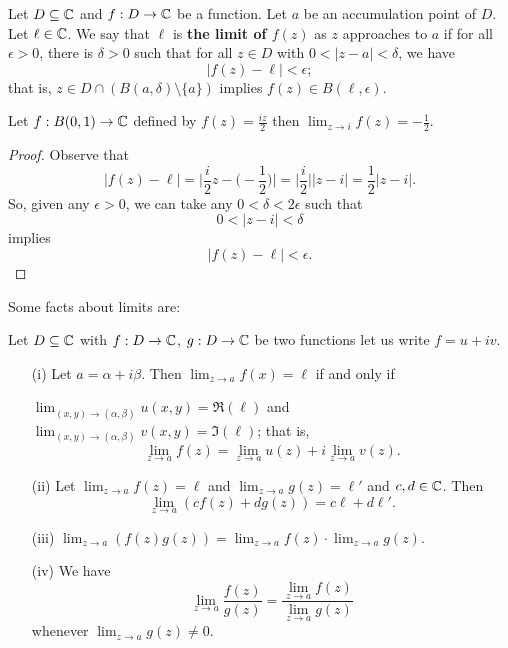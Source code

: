 \documentclass[a4paper]{report}
\begin{document}
\begin{definition}
    Let \( D \subseteq \mathbb{C}   \) and \( f: D \to \mathbb{C}  \) be a function. Let \( a \) be an accumulation point of \( D  \). Let \( \ell \in \mathbb{C}  \). We say that \( \ell  \) is \textbf{the limit of \( f(z) \)} as \( z  \) approaches to \( a  \) if for all \( \epsilon > 0 \), there is \( \delta> 0  \) such that for all \( z \in D  \) with \( 0 < |  z - a  |  < \delta \), we have
    \[  | f(z) - \ell | < \epsilon; \]
    that is, \( z \in D \cap (B(a,\delta) \setminus  \{ a \} ) \) implies \( f(z) \in B(\ell, \epsilon) \).
\end{definition}

\begin{eg}
    Let \( f: B(0,1) \to \mathbb{C}  \) defined by \( f(z) = \frac{ iz }{ 2  }  \) then \( \lim_{ z \to i }  f(z) = - \frac{ 1 }{ 2 }  \).
\end{eg}
\begin{proof}
Observe that 
\[  | f(z) - \ell | = \Big| \frac{ i }{ 2 } z - \Big(  - \frac{ 1 }{ 2 }  \Big) \Big| = \Big| \frac{ i }{ 2 }  \Big|  | z - i  |  = \frac{ 1 }{ 2 }  | z - i  |.  \]
So, given any \( \epsilon > 0  \), we can take any \( 0 < \delta< 2 \epsilon  \) such that 
\[  0 < | z - i  | < \delta  \] implies 
\[  | f(z) - \ell | < \epsilon. \]
\end{proof}

Some facts about limits are:

\begin{theorem}[ ]
    Let \( D \subseteq \mathbb{C}  \) with \( f: D \to \mathbb{C}  \), \( g: D \to \mathbb{C}  \) be two functions let us write \( f = u + i v \).
    \begin{enumerate}
        \item[(i)] Let \( a = \alpha + i \beta \). Then \( \lim_{ z \to a  } f(x) = \ell \) if and only if 
        \begin{center}
            \( \lim_{ (x,y) \to (\alpha, \beta) } u(x,y) = \Re(\ell)  \) and \( \lim_{ (x,y) \to (\alpha, \beta)  } v(x,y) = \Im(\ell) \); that is,
            \[  \lim_{ z \to a }  f(z) = \lim_{ z \to a }  u(z) + i \lim_{ z \to a } v(z). \] 
        \end{center}
    \item[(ii)] Let \( \lim_{ z \to  a  }  f(z) = \ell  \) and \( \lim_{ z \to a } g(z) = \ell' \) and \( c,d \in \mathbb{C}  \). Then
        \[  \lim_{ z \to a }  (cf(z) + dg(z)) = c \ell + d \ell'.  \]
    \item[(iii)] \( \lim_{ z \to a } (f(z)g(z)) = \lim_{ z \to a } f(z) \cdot \lim_{ z \to a }  g(z) \).
    \item[(iv)] We have
        \[  \lim_{ z \to a }  \frac{ f(z) }{ g(z) }  = \frac{ \lim_{ z \to a }  f(z) }{ \lim_{ z \to a } g(z) }  \]
        whenever \( \lim_{ z \to a } g(z) \neq 0  \).
    \end{enumerate}
\end{theorem}
\end{document}
